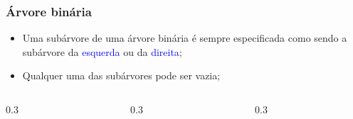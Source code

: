 \documentclass{beamer}
\newcommand{\tcb}[1]{\textcolor{blue}{#1}}
\begin{document}
\begin{frame}[c]
  \frametitle{Árvore binária}

  \begin{itemize}
    \item Uma subárvore de uma árvore binária é sempre especificada como sendo
          a subárvore da \tcb{esquerda} ou da \tcb{direita};
    \item Qualquer uma das subárvores pode ser vazia;
  \end{itemize}

  \vspace{0.5cm}

  \begin{columns}
    \begin{column}{0.3\textwidth}
      \centering
    \end{column}
    \begin{column}{0.3\textwidth}
      \centering
    \end{column}
    \begin{column}{0.3\textwidth}
      \centering
    \end{column}
  \end{columns}
\end{frame}
\end{document}

